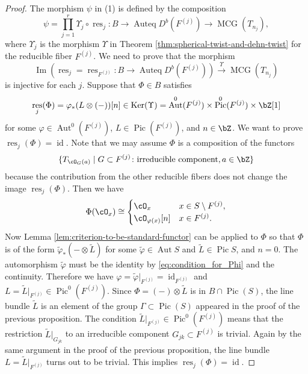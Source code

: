 \documentclass{amsart}
\numberwithin{equation}{section}
\theoremstyle{plain}
\theoremstyle{definition}
\DeclareMathOperator{\Auteq}{\mathrm{Auteq}}
\DeclareMathOperator{\id}{\mathrm{id}}
\DeclareMathOperator{\Pic}{\mathrm{Pic}}
\DeclareMathOperator{\MCG}{\mathrm{MCG}}
\DeclareMathOperator{\Ker}{\mathrm{Ker}}
\DeclareMathOperator{\Image}{\mathrm{Im}}
\DeclareMathOperator{\Aut}{\mathrm{Aut}}
\DeclareMathOperator{\res}{\mathrm{res}}
\begin{document}
\begin{proof}
    The morphism $\psi$ in (1) is defined by the composition
    \begin{equation}
        \psi = \prod_{j=1}^r \Upsilon_j \circ \res_j \colon B \to \Auteq D^b(F^{(j)}) \to \MCG(T_{n_j}),
    \end{equation}
    where $\Upsilon_j$ is the morphism $\Upsilon$ in Theorem \ref{thm:spherical-twist-and-dehn-twist} for the reducible fiber $F^{(j)}$.
    We need to prove that the morphism
    \begin{equation}
        \Image\left(\res_j = \res_{F^{(j)}} \colon B \to \Auteq D^b(F^{(j)})\right) \xrightarrow{\Upsilon} \MCG(T_{n_j})
    \end{equation}
    is injective for each $j$.
    Suppose that $\Phi \in B$ satisfies
    \begin{equation}
        \res_j(\Phi) = \varphi_*(L \otimes (-))[n] \in \Ker(\Upsilon) = \Aut^0(F^{(j)})\times \Pic^0(F^{(j)}) \times \bZ[1]
    \end{equation}
    for some $\varphi \in \Aut^0(F^{(j)})$, $L \in \Pic(F^{(j)})$, and $n \in \bZ$.
    We want to prove $\res_j(\Phi) = \id$.
    Note that we may assume $\Phi$ is a composition of the functors
    \begin{equation}
        \{T_{\cO_{G}(a)} \mid G \subset F^{(j)} \colon \text{irreducible component}, a \in \bZ\}
    \end{equation}
    because the contribution from the other reducible fibers does not change the image $\res_j(\Phi)$.
    Then we have
    \begin{equation}\label{eq:condition_for_Phi}
        \Phi(\cO_x) \cong \begin{cases}
            \cO_x               & x \in S \setminus F^{(j)}, \\
            \cO_{\varphi(x)}[n] & x \in F^{(j)}.
        \end{cases}
    \end{equation}
    Now Lemma \ref{lem:criterion-to-be-standard-functor} can be applied to $\Phi$ so that $\Phi$ is of the form $\widetilde{\varphi}_*(- \otimes \widetilde{L})$ for some $\widetilde{\varphi}\in \Aut{S}$ and $\widetilde{L} \in \Pic{S}$, and $n = 0$.
    The automorphism $\widetilde{\varphi}$ must be the identity by \eqref{eq:condition_for_Phi} and the continuity.
    Therefore we have $\varphi = \widetilde{\varphi}\lvert_{F^{(j)}} = \id_{F^{(j)}}$ and $L = \widetilde{L}\lvert_{F^{(j)}} \in \Pic^0(F^{(j)})$.
    Since $\Phi = (-) \otimes \widetilde{L}$ is in $B \cap \Pic(S)$, the line bundle $\widetilde{L}$ is an element of the group $\Gamma \subset \Pic(S)$ appeared in the proof of the previous proposition.
    The condition $\widetilde{L}\lvert_{F^{(j)}} \in \Pic^0(F^{(j)})$ means that the restriction $\widetilde{L} \lvert_{G_{jk}}$ to an irreducible component $G_{jk} \subset F^{(j)}$ is trivial.
    Again by the same argument in the proof of the previous proposition, the line bundle $L = \widetilde{L}\lvert_{F^{(j)}}$ turns out to be trivial.
    This implies $\res_j(\Phi) = \id$.


\end{proof}
\end{document}
